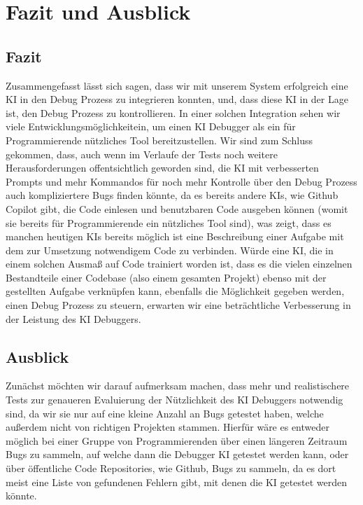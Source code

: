 \documentclass[a4paper,12pt,ngerman]{scrartcl}
\begin{document}
\section{Fazit und Ausblick}

\subsection{Fazit}

Zusammengefasst lässt sich sagen, dass wir mit unserem System erfolgreich eine KI in den Debug Prozess zu integrieren konnten, und, dass diese KI in der Lage ist, den Debug Prozess zu kontrollieren. In einer solchen Integration sehen wir viele Entwicklungsmöglichkeitein, um einen KI Debugger als ein für Programmierende nützliches Tool bereitzustellen. Wir sind zum Schluss gekommen, dass, auch wenn im Verlaufe der Tests noch weitere Herausforderungen offentsichtlich geworden sind, die KI mit verbesserten Prompts und mehr Kommandos für noch mehr Kontrolle über den Debug Prozess auch kompliziertere Bugs finden könnte, da es bereits andere KIs, wie Github Copilot gibt, die Code einlesen und benutzbaren Code ausgeben können (womit sie bereits für Programmierende ein nützliches Tool sind), was zeigt, dass es manchen heutigen KIs bereits möglich ist eine Beschreibung einer Aufgabe mit dem zur Umsetzung notwendigem Code zu verbinden. Würde eine KI, die in einem solchen Ausmaß auf Code trainiert worden ist, dass es die vielen einzelnen Bestandteile einer Codebase (also einem gesamten Projekt) ebenso mit der gestellten Aufgabe verknüpfen kann, ebenfalls die Möglichkeit gegeben werden, einen Debug Prozess zu steuern, erwarten wir eine beträchtliche Verbesserung in der Leistung des KI Debuggers.

\subsection{Ausblick}

Zunächst möchten wir darauf aufmerksam machen, dass mehr und realistischere Tests zur genaueren Evaluierung der Nützlichkeit des KI Debuggers notwendig sind, da wir sie nur auf eine kleine Anzahl an Bugs getestet haben, welche außerdem nicht von richtigen Projekten stammen. Hierfür wäre es entweder möglich bei einer Gruppe von Programmierenden über einen längeren Zeitraum Bugs zu sammeln, auf welche dann die Debugger KI getestet werden kann, oder über öffentliche Code Repositories, wie Github, Bugs zu sammeln, da es dort meist eine Liste von gefundenen Fehlern gibt, mit denen die KI getestet werden könnte.
\end{document}
